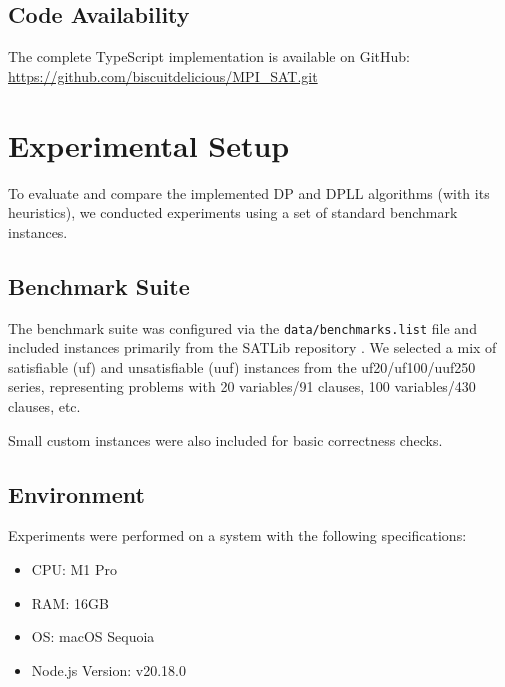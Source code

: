 \documentclass[12pt, a4paper]{article}
\begin{document}
\subsection{Code Availability}
The complete TypeScript implementation is available on GitHub:
\url{https://github.com/biscuitdelicious/MPI_SAT.git} 

\section{Experimental Setup}
\label{sec:experiments}

To evaluate and compare the implemented DP and DPLL algorithms (with its heuristics), we conducted experiments using a set of standard benchmark instances.

\subsection{Benchmark Suite}
The benchmark suite was configured via the \texttt{data/benchmarks.list} file and included instances primarily from the SATLib repository \cite{SATLib}. We selected a mix of satisfiable (uf) and unsatisfiable (uuf) instances from the uf20/uf100/uuf250 series, representing problems with 20 variables/91 clauses, 100 variables/430 clauses, etc. 

Small custom instances were also included for basic correctness checks.

\subsection{Environment}
Experiments were performed on a system with the following specifications:
\begin{itemize}
    \item CPU: M1 Pro
    \item RAM: 16GB
    \item OS: macOS Sequoia
    \item Node.js Version: v20.18.0
\end{itemize}
\end{document}
